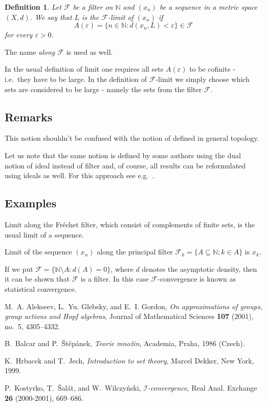 \documentclass[12pt]{article}
\newcommand{\N}[0]{\mathbb{N}}
\newcommand{\ve}{\varepsilon}
\newcommand{\mc}{\mathcal}
\newtheorem{DEF}{Definition}
\newcommand{\F}{\mc F}
\begin{document}
\begin{DEF}
Let $\F$ be a filter on $\N$ and $(x_n)$ be a sequence in a metric
space $(X,d)$. We say that $L$ is the \emph{$\F$-limit} of $(x_n)$
if
$$A(\ve)=\{n\in\N: d(x_n,L)<\ve\} \in \F$$
for every $\ve>0$.
\end{DEF}

The name \emph{ along $\F$} is used as well.

In the usual definition of limit one requires all sets $A(\ve)$ to
be cofinite - i.e.~they have to be large. In the definition of
$\F$-limit we simply choose which sets are considered to be large
- namely the sets from the filter $\F$.

\subsection*{Remarks}

This notion shouldn't be confused with the notion of  defined in general topology.

Let us note that the same notion is defined by some authors using
the dual notion of ideal instead of filter and, of course, all
results can be reformulated using ideals as well. For this
approach see e.g.~\cite{ksw}.

\subsection*{Examples}

Limit along the Fr\'echet filter, which consist of complements of
finite sets, is the usual limit of a sequence.

Limit of the sequence $(x_n)$ along the principal filter
$\F_k=\{A\subseteq\N; k\in A\}$ is $x_k$.

If we put $\F=\{\N\setminus A: d(A)=0\}$, where $d$ denotes the
asymptotic density, then it can be shown that $\F$ is a filter. In
this case $\F$-convergence is known as statistical convergence.

\begin{thebibliography}{1}

M.~A. Alekseev, L.~{Yu.} Glebsky, and E.~I. Gordon, \emph{On
approximations of
  groups, group actions {and Hopf} algebras}, Journal of Mathematical Sciences
  \textbf{107} (2001), no.~5, 4305--4332.

B.~Balcar and P.~{\v{S}}t\v{e}p\'anek, \emph{Teorie mno\v{z}in},
Academia,
  Praha, 1986 (Czech).

K.~Hrbacek and T.~Jech, \emph{{Introduction to set theory}},
{Marcel Dekker},
  New York, 1999.

P.~Kostyrko, T.~{\v{S}}al{\'a}t, and W.~Wilczy{\'n}ski,
  \emph{{$\mathcal{I}$}-convergence}, Real Anal. Exchange \textbf{26}
  (2000-2001), 669--686.

\end{thebibliography}
\end{document}

